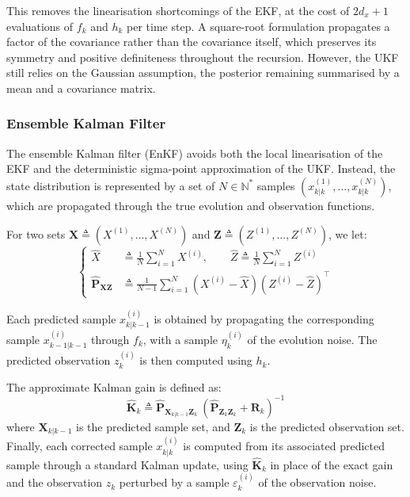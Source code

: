This removes the linearisation shortcomings of the EKF, at the cost of $2d_x+1$ evaluations of $f_k$ and $h_k$ per time step. A square-root formulation \cite{bib:SRUKF} propagates a factor of the covariance rather than the covariance itself, which preserves its symmetry and positive definiteness throughout the recursion. However, the UKF still relies on the Gaussian assumption, the posterior remaining summarised by a mean and a covariance matrix.

\subsubsection{Ensemble Kalman Filter}

The ensemble Kalman filter (EnKF) \cite{bib:EnKF} avoids both the local linearisation of the EKF and the deterministic sigma-point approximation of the UKF. Instead, the state distribution is represented by a set of $N\in\mathbb{N}^*$ samples $\left(x_{k|k}^{(1)},\dots,x_{k|k}^{(N)}\right)$, which are propagated through the true evolution and observation functions.

For two sets $\mathbf{X}\triangleq(X^{(1)},\dots,X^{(N)})$ and $\mathbf{Z}\triangleq(Z^{(1)},\dots,Z^{(N)})$, we let:
\begin{equation}
	\left\{\begin{aligned}
	\hat{X}&\triangleq\frac{1}{N}\sum_{i=1}^NX^{(i)},\qquad
	\hat{Z}\triangleq\frac{1}{N}\sum_{i=1}^NZ^{(i)}\\
	\hat{\mathbf{P}}_{\mathbf{XZ}}&\triangleq\frac{1}{N-1}\sum_{i=1}^N\left(X^{(i)}-\hat{X}\right)\left(Z^{(i)}-\hat{Z}\right)^\top
	\end{aligned}\right.
\end{equation}

Each predicted sample $x_{k|k-1}^{(i)}$ is obtained by propagating the corresponding sample $x_{k-1|k-1}^{(i)}$ through $f_k$, with a sample $\eta_k^{(i)}$ of the evolution noise. The predicted observation $z_k^{(i)}$ is then computed using $h_k$.

The approximate Kalman gain is defined as:
\begin{equation}
	\hat{\mathbf{K}}_k\triangleq\hat{\mathbf{P}}_{\mathbf{X}_{k|k-1}\mathbf{Z}_k}\:\left(\hat{\mathbf{P}}_{\mathbf{Z}_k\mathbf{Z}_k}+\mathbf{R}_k\right)^{-1}
\end{equation}
where $\mathbf{X}_{k|k-1}$ is the predicted sample set, and $\mathbf{Z}_k$ is the predicted observation set. Finally, each corrected sample $x_{k|k}^{(i)}$ is computed from its associated predicted sample through a standard Kalman update, using $\hat{\mathbf{K}}_k$ in place of the exact gain and the observation $z_k$ perturbed by a sample $\varepsilon_k^{(i)}$ of the observation noise.

